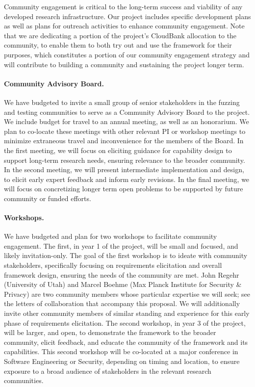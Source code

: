 Community engagement is critical to the long-term success and viability of any
developed research infrastructure.  Our project includes specific development
plans as well as plans for outreach activities to enhance community engagement.  
Note that we are dedicating a portion of the project's CloudBank allocation to
the community, to enable them to both try out and use the framework for their
purposes, which constitutes a portion of our community engagement strategy and
will contribute to building a community and sustaining the project longer term. 

\paragraph{Community Advisory Board.} We have budgeted to invite a small group
of senior stakeholders in the fuzzing and testing communities to serve as a
Community Advisory Board to the project.  We include budget for travel to an
annual meeting, as well as an honorarium. We plan to co-locate these meetings with
other relevant PI or workshop meetings to minimize extraneous travel and
inconvenience for the members of the Board.  In the first meeting, we will focus
on eliciting guidance for capability design to support long-term research needs,
ensuring relevance to the broader community.  In the second meeting, we will
present intermediate implementation and design, to elicit early expert feedback
and inform early revisions.  In the final meeting, we will focus on concretizing
longer term open problems to be supported by future community or funded efforts. 


\paragraph{Workshops.}  We have budgeted and plan for two workshops to
facilitate community engagement.  The first, in year 1 of the project, will be
small and focused, and likely invitation-only. The goal of the first workshop is
to ideate with community stakeholders, specifically focusing on requirements
elicitation and overall framework design, ensuring the needs of the community
are met.  John Regehr (University of Utah) and Marcel Boehme (Max Planck
Institute for Security \& Privacy) are two community members whose particular
expertise we will seek; see the letters of collaboration that accompany this
proposal.  We will additionally invite other community members of similar
standing and experience for this early phase of requirements elicitation.   The
second workshop, in year 3 of the project, will be larger, and open, to demonstrate the
framework to the broader community, elicit feedback, and educate the community
of the framework and its capabilities.  This second workshop will be co-located
at a major conference in Software Engineering or Security, depending on timing
and location, to ensure exposure to a broad audience of stakeholders in the
relevant research communities. 

